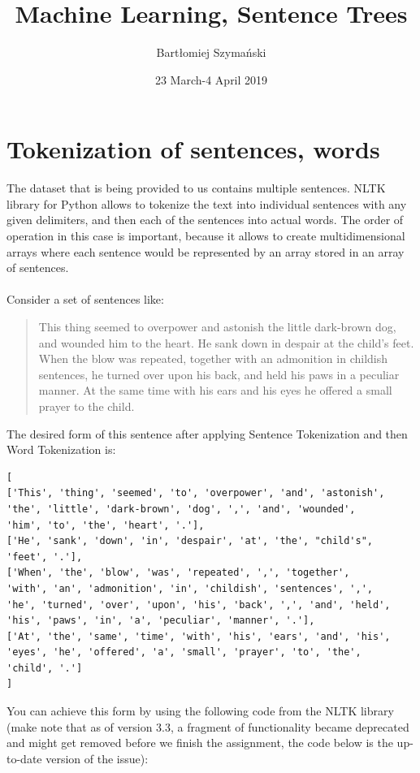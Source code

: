 \documentclass{article}
\title{Machine Learning, Sentence Trees}
\author{Bartłomiej Szymański}
\date{23 March-4 April 2019}
\begin{document}
\maketitle

\section{Tokenization of sentences, words}
The dataset that is being provided to us contains multiple sentences. NLTK library for Python allows to tokenize\cite{Tokenization} the text into individual sentences with any given delimiters, and then each of the sentences into actual words. The order of operation in this case is important, because it allows to create multidimensional arrays where each sentence would be represented by an array stored in an array of sentences.\\ \\
Consider a set of sentences like:
\begin{quote}
This thing seemed to overpower and astonish the little dark-brown dog, and wounded him to the heart. He sank down in despair at the child's feet. When the blow was repeated, together with an admonition in childish sentences, he turned over upon his back, and held his paws in a peculiar manner. At the same time with his ears and his eyes he offered a small prayer to the child.
\end{quote}
The desired form of this sentence after applying Sentence Tokenization and then Word Tokenization is:
\begin{verbatim}
[
['This', 'thing', 'seemed', 'to', 'overpower', 'and', 'astonish', 
'the', 'little', 'dark-brown', 'dog', ',', 'and', 'wounded', 
'him', 'to', 'the', 'heart', '.'],
['He', 'sank', 'down', 'in', 'despair', 'at', 'the', "child's", 
'feet', '.'],
['When', 'the', 'blow', 'was', 'repeated', ',', 'together', 
'with', 'an', 'admonition', 'in', 'childish', 'sentences', ',', 
'he', 'turned', 'over', 'upon', 'his', 'back', ',', 'and', 'held', 
'his', 'paws', 'in', 'a', 'peculiar', 'manner', '.'],
['At', 'the', 'same', 'time', 'with', 'his', 'ears', 'and', 'his', 
'eyes', 'he', 'offered', 'a', 'small', 'prayer', 'to', 'the', 
'child', '.']
]
\end{verbatim}
You can achieve this form by using the following code from the NLTK library (make note that as of version 3.3, a fragment of functionality became deprecated and might get removed before we finish the assignment, the code below is the up-to-date version of the issue)\cite{Demo of TweetTokenizer}\cite{New NLTK Tokenizer}:
\end{document}
